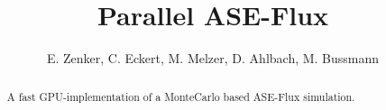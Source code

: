 \documentclass[5p]{elsarticle}
\title{Parallel ASE-Flux}
\author{E. Zenker, C. Eckert, M. Melzer, D. Ahlbach, M. Bussmann}
\begin{document}
\maketitle
\begin{abstract}
A fast GPU-implementation of a MonteCarlo based ASE-Flux simulation.
\end{abstract}





		
\end{document}
